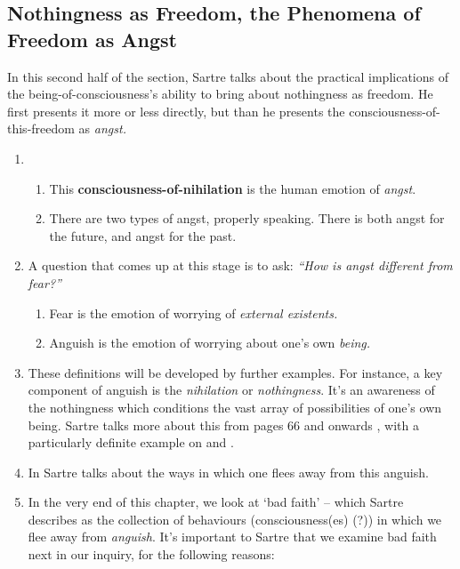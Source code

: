 \subsection*{Nothingness as Freedom, the Phenomena of Freedom as Angst}
In this second half of the section, Sartre talks about the practical implications of the being-of-consciousness's ability to bring about nothingness as freedom. He first presents it more or less directly, but than he presents the consciousness-of-this-freedom as \emph{angst.}

\begin{enumerate}
  \item {}
  \begin{enumerate}
    \item This \textbf{consciousness-of-nihilation} is the human emotion of \emph{angst}. 
    \item There are two types of angst, properly speaking. There is both angst for the future, and angst for the past.
  \end{enumerate}
  \item A question that comes up at this stage is to ask: \emph{\enquote{How is angst different from \emph{fear}?}}
  \begin{enumerate}
    \item Fear is the emotion of worrying of \emph{external existents.}
    \item Anguish is the emotion of worrying about one's own \emph{being.}
  \end{enumerate}
  \item These definitions will be developed by further examples. For instance, a key component of anguish is the \emph{nihilation} or \emph{nothingness}. It's an awareness of the nothingness which conditions the vast array of possibilities of one's own being. Sartre talks more about this from pages 66 and onwards \autocite[66]{sartre}, with a particularly definite example on \autocite[71]{sartre} and \autocite[77]{sartre}.
  \item In \autocite[80]{sartre} Sartre talks about the ways in which one flees away from this anguish.
  \item In the very end of this chapter, we look at \enquote*{bad faith} -- which Sartre describes as the collection of behaviours (consciousness(es) (?)) in which we flee away from \emph{anguish}. It's important to Sartre that we examine bad faith next in our inquiry, for the following reasons:

\end{enumerate}
